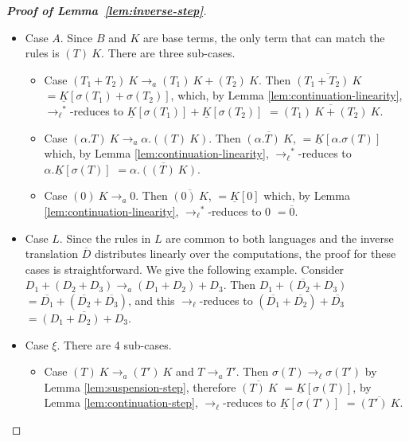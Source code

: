 \documentclass{LMCS}
\newcommand{\xto}[1]{\ensuremath{\rightarrow_{#1}}}
\newcommand{\tolinred}{\xto{\ell}}
\newcommand{\toalgred}{\xto{a}}
\newcommand{\stolinred}{\ensuremath{\xto{\ell}^{\ast}}}
\newcommand{\tobn}{\xto{\beta_n}}
\newcommand{\toblinred}{\xto{\ell\cup\beta_v}}
\begin{document}
\begin{proof}[\bf Proof of Lemma~\ref{lem:inverse-step}]
\begin{itemize}
\begin{itemize}
	\item Case $((\lambda x\,S)~B)~K\tobn S[x:=B]K$. Then $\psi(B)$ is a
	  base term, and hence $(\lambda x\,\sigma(S))~\psi(B)\toblinred\sigma(S)[x:=\psi(B)]$,
	  so
	  $\overline{((\lambda x\,S)~B)~K}$
	  $=\underline{K}[(\lambda x\,\sigma(S))~\psi(B)]$,
	  which, by Lemma \ref{lem:continuation-step}, \toblinred-reduces to
	  $\underline{K}[\sigma(S)[x:=\psi(B)]]$,
	  which, by Lemma \ref{lem:substitution-lemma}, is equal to
	  $\underline{K}[\sigma(S[x:=B])]$
	  $=\overline{(S[x:=B])~K}$.
      \end{itemize}
    \item Case $A$. Since $B$ and $K$ are base terms, the only term that
      can match the rules is $(T)~K$. There are three sub-cases. 
      \begin{itemize}
	\item Case $(T_{1}+T_{2})~K\toalgred (T_{1})~K+(T_{2})~K$. Then 
	  $\overline{(T_{1}+T_{2})~K}$
	  $=\underline{K}[\sigma(T_{1})+\sigma(T_{2})]$,
	  which, by Lemma \ref{lem:continuation-linearity}, \stolinred-reduces to
	  $\underline{K}[\sigma(T_{1})]+\underline{K}[\sigma(T_{2})]$
	  $=\overline{(T_{1})~K+(T_{2})~K}$.
	\item Case $(\alpha.T)~K\toalgred\alpha.((T)~K)$. Then 
	  $\overline{(\alpha.T)~K}$,
	  $=\underline{K}[\alpha.\sigma(T)]$
	  which, by Lemma \ref{lem:continuation-linearity}, \stolinred-reduces to
	  $\alpha.\underline{K}[\sigma(T)]$
	  $=\overline{\alpha.((T)~K)}$.
	\item Case $(0)~K\toalgred0$. Then 
	  $\overline{(0)~K}$,
	  $=\underline{K}[0]$
	  which, by Lemma \ref{lem:continuation-linearity}, \stolinred-reduces to
	  $0$
	  $=\overline{0}$.
      \end{itemize}
    \item Case $L$. Since the rules in $L$ are common to both languages and
      the inverse translation $\overline{D}$ distributes linearly over
      the computations, the proof for these cases is straightforward. We
      give the following example. Consider $D_{1}+(D_{2}+D_{3})\toalgred(D_{1}+D_{2})+D_{3}$.
      Then
      $\overline{D_{1}+(D_{2}+D_{3})}$
      $=\overline{D_{1}}+(\overline{D_{2}}+\overline{D_{3}})$,
      and this \tolinred-reduces to
      $(\overline{D_{1}}+\overline{D_{2}})+\overline{D_{3}}$
      $=\overline{(D_{1}+D_{2})+D_{3}}$.

    \item Case $\xi$. There are 4 sub-cases.
      \begin{itemize}
	\item Case $(T)~K\toalgred (T')~K$ and $T\toalgred T'$. Then $\sigma(T)\tolinred\sigma(T')$
	  by Lemma \ref{lem:suspension-step}, therefore 
	  $\overline{(T)~K}$
	  $=\underline{K}[\sigma(T)]$,
	  by Lemma \ref{lem:continuation-step}, \tolinred-reduces to
	  $\underline{K}[\sigma(T')]$
	  $=\overline{(T')~K}$.


\end{itemize}
\end{itemize}
\end{proof}
\end{document}

